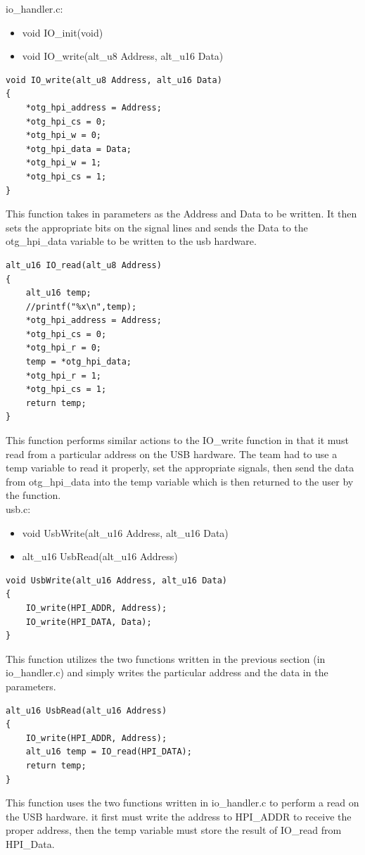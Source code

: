 \documentclass[journal, twocolumn, final,11pt,letterpaper]{IEEEtran}
\begin{document}
io\_handler.c:
\begin{itemize}
	\item 	void IO\_init(void)
	\item 	void IO\_write(alt\_u8 Address, alt\_u16 Data)
\end{itemize}


\begin{lstlisting}
void IO_write(alt_u8 Address, alt_u16 Data)
{
	*otg_hpi_address = Address;
	*otg_hpi_cs = 0;
	*otg_hpi_w = 0;
	*otg_hpi_data = Data;
	*otg_hpi_w = 1;
	*otg_hpi_cs = 1;
}
\end{lstlisting}
This function takes in parameters as the Address and Data to be written. It then sets the appropriate bits on the signal lines and sends the Data to the otg\_hpi\_data variable to be written to the usb hardware.\\ 

\begin{lstlisting}
alt_u16 IO_read(alt_u8 Address)
{
	alt_u16 temp;
	//printf("%x\n",temp);
	*otg_hpi_address = Address;
	*otg_hpi_cs = 0;
	*otg_hpi_r = 0;
	temp = *otg_hpi_data;
	*otg_hpi_r = 1;
	*otg_hpi_cs = 1;
	return temp;
}
\end{lstlisting}
This function performs similar actions to the IO\_write function in that it must read from a particular address on the USB hardware. The team had to use a temp variable to read it properly, set the appropriate signals, then send the data from otg\_hpi\_data into the temp variable which is then returned to the user by the function.\\

usb.c:
\begin{itemize}
	\item 	void UsbWrite(alt\_u16 Address, alt\_u16 Data)
	\item 	alt\_u16 UsbRead(alt\_u16 Address)
\end{itemize}
\begin{lstlisting}
void UsbWrite(alt_u16 Address, alt_u16 Data)
{
	IO_write(HPI_ADDR, Address);
	IO_write(HPI_DATA, Data);
}
\end{lstlisting}
This function utilizes the two functions written in the previous section (in io\_handler.c) and simply writes the particular address and the data in the parameters.


\begin{lstlisting}
alt_u16 UsbRead(alt_u16 Address)
{
	IO_write(HPI_ADDR, Address);
	alt_u16 temp = IO_read(HPI_DATA);
	return temp;
}
\end{lstlisting}
This function uses the two functions written in io\_handler.c to perform a read on the USB hardware. it first must write the address to HPI\_ADDR to receive the proper address, then the temp variable must store the result of IO\_read from HPI\_Data. 
\end{document}
